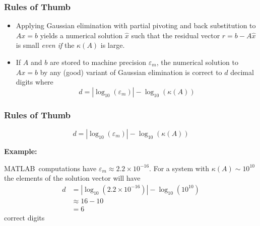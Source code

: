 \documentclass[10pt]{beamer}
\newcommand{\epsm}{\ensuremath{\varepsilon_m}}
\begin{document}
\begin{frame}
\frametitle{Rules of Thumb}

\begin{itemize}
    \item   Applying Gaussian elimination with partial pivoting and
            back substitution to $Ax=b$ yields a numerical solution
            $\hat{x}$ such that the residual vector $r=b-A\hat{x}$ is
            small \emph{even if} the $\kappa(A)$ is large.
    \item   If $A$ and $b$ are stored to machine precision $\epsm$, the
            numerical solution to $Ax=b$ by any (good) variant of Gaussian
            elimination is correct to $d$ decimal digits where
\begin{equation*}
                d = | \log_{10}(\epsm)| - \log_{10}\left(\kappa(A)\right)
\end{equation*}
\end{itemize}

\end{frame}
\begin{frame}
\frametitle{Rules of Thumb}

\begin{equation*}
	d = | \log_{10}(\epsm)| - \log_{10}\left(\kappa(A)\right)
\end{equation*}

\textbf{Example:}\par
MATLAB\ computations have $\epsm\approx 2.2\times10^{-16}$.  For a system
with $\kappa(A)\sim10^{10}$ the elements of the solution vector will have
\begin{align*}
    d &= | \log_{10}(2.2\times10^{-16})| - \log_{10}\left(10^{10}\right) \\
      &\approx 16 - 10  \\
      &= 6
\end{align*}
correct digits

\end{frame}
\end{document}
